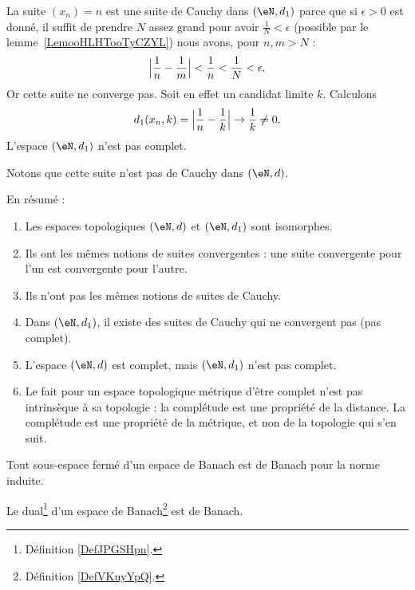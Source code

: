 \begin{example}
	La suite \( (x_n)=n\) est une suite de Cauchy dans \( (\eN,d_1)\) parce que si \( \epsilon>0\) est donné, il suffit de prendre \( N\) assez grand pour avoir \( \frac{1}{ N }<\epsilon\) (possible par le lemme~\ref{LemooHLHTooTyCZYL}) nous avons, pour \( n,m>N\) :
	\begin{equation}
		\Bigl| \frac{1}{ n }-\frac{1}{ m } \Bigr|<\frac{1}{ n }<\frac{1}{ N }<\epsilon.
	\end{equation}
	Or cette suite ne converge pas. Soit en effet un candidat limite \( k\). Calculons
	\begin{equation}
		d_1(x_n,k)= \Bigl| \frac{1}{ n }-\frac{1}{ k } \Bigr |\to \frac{1}{ k }\neq 0.
	\end{equation}
	L'espace \( (\eN,d_1)\) n'est pas complet.

	Notons que cette suite n'est pas de Cauchy dans \( (\eN,d)\).

	En résumé :
	\begin{enumerate}
		\item
		      Les espaces topologiques \( (\eN,d)\) et \( (\eN,d_1)\) sont isomorphes.
		\item
		      Ils ont les mêmes notions de suites convergentes : une suite convergente pour l'un est convergente pour l'autre.
		\item
		      Ils n'ont pas les mêmes notions de suites de Cauchy.
		\item
		      Dans \(  (\eN,d_1)  \), il existe des suites de Cauchy qui ne convergent pas (pas complet).
		\item
		      L'espace \( (\eN,d)\) est complet, mais \( (\eN,d_1)\) n'est pas complet.
		\item
		      Le fait pour un espace topologique métrique d'être complet n'est pas intrinsèque à sa topologie : la complétude est une propriété de la distance. La complétude est une propriété de la métrique, et non de la topologie qui s'en suit.
	\end{enumerate}
\end{example}

\begin{proposition}	\label{PROPooUNVAooRDxkyI}
	Tout sous-espace fermé d'un espace de Banach est de Banach pour la norme induite.
\end{proposition}


\begin{proposition}     \label{PROPooOVGGooNffWJW}
	Le dual\footnote{Définition \ref{DefJPGSHpn}.} d'un espace de Banach\footnote{Définition \ref{DefVKuyYpQ}.} est de Banach.
\end{proposition}


